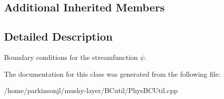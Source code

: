 \subsection*{Additional Inherited Members}


\subsection{Detailed Description}
Boundary conditions for the streamfunction $ \psi $. 

The documentation for this class was generated from the following file\+:\begin{DoxyCompactItemize}
\item 
/home/parkinsonjl/mushy-\/layer/\+B\+Cutil/Phys\+B\+C\+Util.\+cpp\end{DoxyCompactItemize}
